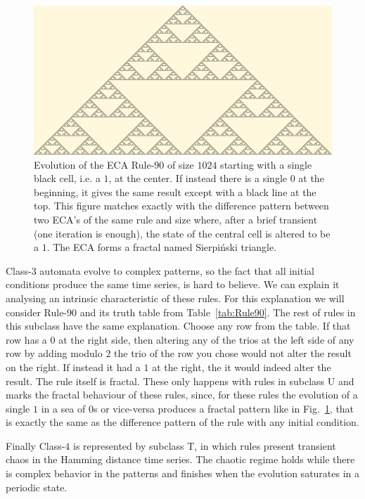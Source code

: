 \begin{figure}
    \centering
    \includegraphics[width=\linewidth]{Images/P4/Sierpinski.png}
    \caption{Evolution of the ECA Rule-$90$ of size $1024$ starting with a single black cell, i.e. a $1$, at the center. If instead there is a single $0$ at the beginning, it gives the same result except with a black line at the top. This figure matches exactly with the difference pattern between two ECA's of the same rule and size where, after a brief transient (one iteration is enough), the state of the central cell is altered to be a $1$. The ECA forms a fractal named Sierpiński triangle.}
    \label{fig:Rule90}
\end{figure}




Class-$3$ automata evolve to complex patterns, so the fact that all initial conditions produce the same time series, is hard to believe. We can explain it analysing an intrinsic characteristic of these rules. For this explanation we will consider Rule-$90$ and its truth table from Table~\ref{tab:Rule90}. The rest of rules in this subclass have the same explanation. Choose any row from the table. If that row has a $0$ at the right side, then altering any of the trios at the left side of any row by adding modulo $2$ the trio of the row you chose would not alter the result on the right. If instead it had a $1$ at the right, the it would indeed alter the result. The rule itself is fractal. These only happens with rules in subclass U and marks the fractal behaviour of these rules, since, for these rules the evolution of a single $1$ in a sea of $0$s or vice-versa produces a fractal pattern like in Fig.~\ref{fig:Rule90}, that is exactly the same as the difference pattern of the rule with any initial condition.

Finally Class-$4$ is represented by subclass T, in which rules present transient chaos in the Hamming distance time series. The chaotic regime holds while there is complex behavior in the patterns and finishes when the evolution saturates in a periodic state.



